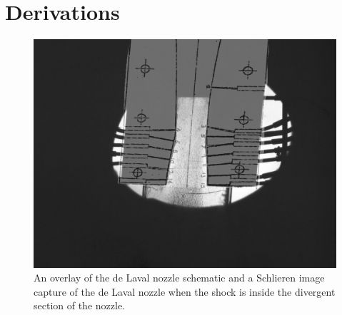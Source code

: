 \section{Derivations} \label{sec:derivations}

\begin{figure}[htpb]
    \centering
    \includegraphics[width=0.75\linewidth]{Figures/Nozzle Overlay with Shock.jpg}
    \caption[An overlay of the de Laval nozzle schematic and an image of the nozzle when a normal shock is present.]{An overlay of the de Laval nozzle schematic and a Schlieren image capture of the de Laval nozzle when the shock is inside the divergent section of the nozzle.}
    \label{fig:schlieren_overlay}
\end{figure}